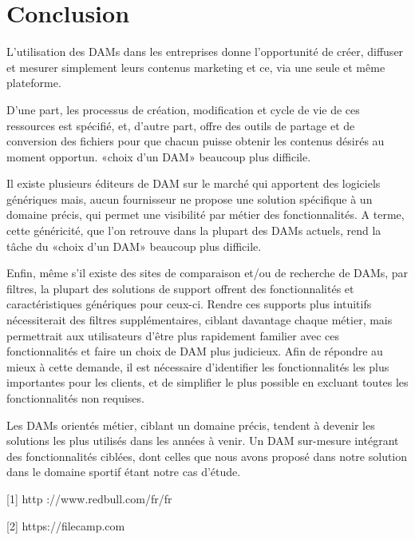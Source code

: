 \chapter{Conclusion}
L'utilisation des DAMs dans les entreprises donne l'opportunité de créer, diffuser et mesurer simplement leurs contenus marketing et ce, via une seule et même plateforme.
\newline

D'une part, les processus de création, modification et cycle de vie de ces ressources est spécifié, et, d'autre part, offre des outils de partage et de conversion des fichiers pour que chacun puisse obtenir les contenus désirés au moment opportun.
«choix d'un DAM» beaucoup plus difficile.
\newline

Il existe plusieurs éditeurs de DAM sur le marché qui apportent des logiciels génériques mais, aucun fournisseur ne propose une solution spécifique à un domaine précis, qui permet une visibilité par métier des fonctionnalités. A terme, cette généricité, que l'on retrouve dans la plupart des DAMs actuels, rend la tâche du «choix d'un DAM» beaucoup plus difficile.
\newline

Enfin, même s'il existe des sites de comparaison et/ou de recherche de DAMs, par filtres, la plupart des solutions de support offrent des fonctionnalités et caractéristiques génériques pour ceux-ci. Rendre ces supports plus intuitifs nécessiterait des filtres supplémentaires, ciblant davantage chaque métier, mais permettrait aux utilisateurs d'être plus rapidement familier avec ces fonctionnalités et faire un choix de DAM plus judicieux. 
Afin de répondre au mieux à cette demande, il est nécessaire d'identifier les fonctionnalités les plus importantes pour les clients,
et de simplifier le plus possible en excluant toutes les fonctionnalités non requises.\newline

Les DAMs orientés métier, ciblant un domaine précis, tendent à devenir les solutions les plus utilisés dans les années à venir. Un DAM sur-mesure intégrant des fonctionnalités ciblées, dont celles que nous avons proposé dans notre solution dans le domaine sportif étant notre cas d’étude.



[1] http ://www.redbull.com/fr/fr
\newline

[2] https://filecamp.com
\newline

